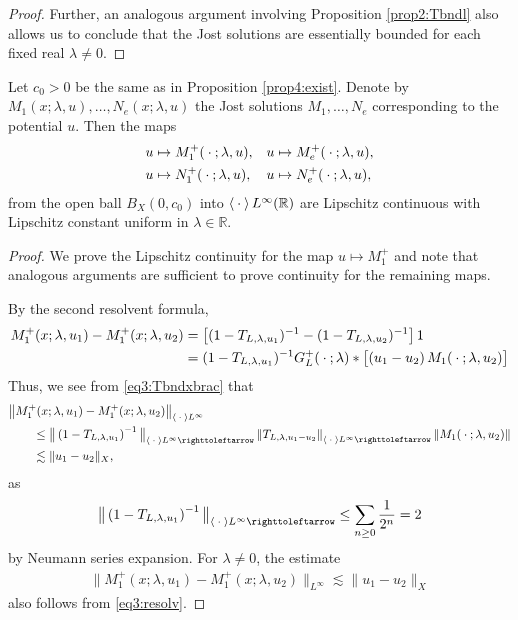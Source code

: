 \documentclass[../dissertation.tex]{subfiles}
\begin{document}
\begin{proof}
	Further, an analogous argument involving Proposition \ref{prop2:Tbndl} 
	also allows us to conclude that the Jost solutions are essentially 
	bounded for each fixed real $\lambda \ne 0$.
\end{proof}

\begin{lma}[Continuity in $u$]\label{lma4:cont}
	Let $c_0 > 0$ be the same as in Proposition \ref{prop4:exist}. Denote by 
	$M_1(x; \lambda, u), \ldots, N_e(x; \lambda, u)$ the Jost solutions
	$M_1, \ldots, N_e$ corresponding to the potential $u$. Then the maps
	\begin{align*}
		u &\mapsto M_1^+(\kern 0.5ex \cdot \kern 0.5ex; \lambda, u ), &
		u &\mapsto M_e^+(\kern 0.5ex \cdot \kern 0.5ex; \lambda, u ), \\ 
		u &\mapsto N_1^+(\kern 0.5ex \cdot \kern 0.5ex; \lambda, u ), & 
		u &\mapsto N_e^+(\kern 0.5ex \cdot \kern 0.5ex; \lambda, u ),
	\end{align*}
	from the open ball $B_X(0, c_0)$ into $\left\langle \kern 0.5ex \cdot \kern 0.5ex \right\rangle L^\infty(\mathbb R)$ are 
	Lipschitz continuous with Lipschitz constant uniform in 
	$\lambda \in \mathbb R$.
\end{lma}
\begin{proof}
	We prove the Lipschitz continuity for the map $u \mapsto M_1^+$ and note 
	that analogous arguments are suf{}ficient to prove continuity for the 
	remaining maps.

	By the second resolvent formula,
	\begin{align}\label{eq3:resolv}
		M_1^+(x; \lambda, u_1) - M_1^+(x; \lambda, u_2)
			&= \left[ 
					(1-T_{L, \lambda, u_1})^{-1} -  (1-T_{L,\lambda, u_2})^{-1}
				\right] 1 \\
			&= (1-T_{L, \lambda, u_1})^{-1} G_L^+(\kern 0.5ex \cdot \kern 0.5ex; \lambda) * 
				\big[(u_1 - u_2) \, M_1(\kern 0.5ex \cdot \kern 0.5ex; \lambda, u_2) \big]
				\nonumber
	\end{align}
	Thus, we see from \eqref{eq3:Tbndxbrac} that
	\begin{align}
		&\big\|
			M_1^+(x; \lambda, u_1) - M_1^+(x; \lambda, u_2)
		\big\|_{\inn{\dotarg} L^\infty} 
				\nonumber\\
		&\qquad\leq 
			\big\|
				\left(1 - T_{L,\lambda,u_1}\right)^{-1}
			\big\|_{\inn{\dotarg} L^\infty\toitself}
			\left\|T_{L, \lambda,u_1-u_2}\right\|_{\inn{\dotarg} L^\infty\toitself}
			\|M_1(\dotarg; \lambda, u_2) \| \nonumber\\
		&\qquad\lesssim \|u_1 - u_2\|_X,
	\end{align}
	as 
	\begin{align*}
		\big\|
			\left(1 - T_{L,\lambda,u_1}\right)^{-1}
		\big\|_{\inn{\dotarg} L^\infty\toitself}
			\leq \sum_{n\geq 0} \frac{1}{2^n} = 2
	\end{align*}
	by Neumann series expansion. For $\lambda \ne 0$, the estimate
	\begin{align*}
		\big\|M_1^+(x; \lambda, u_1) - M_1^+(x; \lambda, u_2)\big\|_{L^\infty} 
			\lesssim \|u_1 - u_2\|_X
	\end{align*}
	also follows from \eqref{eq3:resolv}.
\end{proof}
\end{document}
